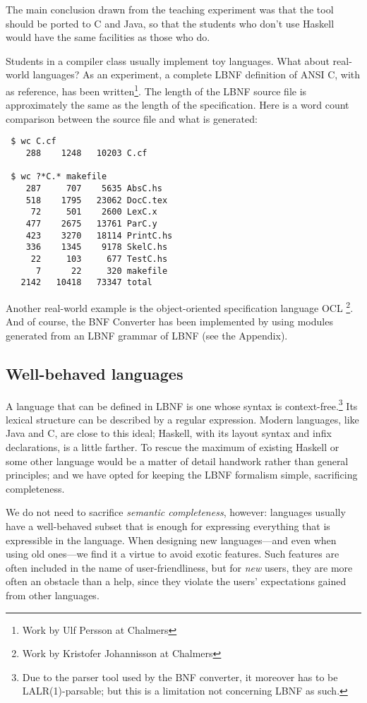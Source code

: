 \documentclass[10pt]{article}
\begin{document}
The main conclusion drawn from the teaching experiment was that the tool should 
be ported to C and Java, so that the students who don't use Haskell
would have the same facilities as those who do.

Students in a compiler class usually implement toy languages.
What about real-world languages?
As an experiment, a complete LBNF definition of
ANSI C, with \cite{Kern88} as reference, has been 
written\footnote{Work by Ulf Persson at Chalmers}. The length of the
LBNF source file is approximately the same as the length of the specification. 
Here is a word count comparison between the source file and what is generated:
\begin{verbatim}
 $ wc C.cf
    288    1248   10203 C.cf

 $ wc ?*C.* makefile
    287     707    5635 AbsC.hs
    518    1795   23062 DocC.tex
     72     501    2600 LexC.x
    477    2675   13761 ParC.y
    423    3270   18114 PrintC.hs
    336    1345    9178 SkelC.hs
     22     103     677 TestC.hs
      7      22     320 makefile
   2142   10418   73347 total
\end{verbatim}
Another real-world 
example is the
object-oriented specification language OCL \cite{WarmerKleppe99}\footnote{
Work by Kristofer Johannisson at Chalmers}. 
And of course, the BNF Converter has been
implemented by using modules generated from
an LBNF grammar of LBNF (see the Appendix).


\subsection{Well-behaved languages}

A language that can be defined in LBNF
is one whose syntax is context-free.\footnote{
Due to the parser tool used by the BNF converter, it
moreover has to be LALR(1)-parsable; but this is 
a limitation not concerning LBNF as such.}
Its lexical structure can be described by
a regular expression. 
Modern languages, like Java and C, are close to this ideal;
Haskell, with its layout syntax and infix declarations, is 
a little farther.
To rescue the maximum of existing Haskell or some other language
would be a matter
of detail handwork rather than general principles; and we have opted
for keeping the LBNF formalism simple, sacrificing completeness.

We do not need to sacrifice {\em semantic completeness}, however:
languages usually have a well-behaved subset that is enough for
expressing everything that is expressible in the language.
When designing new languages---and even when using old 
ones---we find it a virtue to avoid exotic features.
Such features are often included in the name of user-friendliness,
but for {\em new} users, they are more often an obstacle than
a help, since they violate the users' expectations gained from
other languages.
\end{document}
